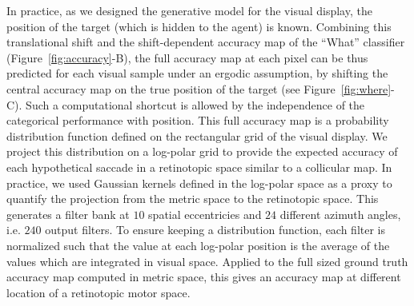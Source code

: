 In practice, as we designed the generative model for the visual display, the position of the target (which is hidden to the agent) is known. Combining this translational shift and the shift-dependent accuracy map of the ``What'' classifier (Figure~\ref{fig:accuracy}-B), the full accuracy map at each pixel can be thus predicted for each visual sample under an ergodic assumption, by shifting the central accuracy map on the true position of the target (see Figure~\ref{fig:where}-C). Such a computational shortcut is allowed by the independence of the categorical performance with position. %
This full accuracy map is a probability distribution function defined on the rectangular grid of the visual display. We project this distribution on a log-polar grid to provide the expected accuracy of each hypothetical saccade in a retinotopic space similar to a collicular map. In practice, we used Gaussian kernels defined in the log-polar space as a proxy to quantify the projection from the metric space to the retinotopic space. This generates a filter bank at $10$ spatial eccentricies and $24$ different azimuth angles, i.e. $240$ output filters. To ensure keeping a distribution function, each filter is normalized such that the value at each log-polar position is the average of the values which are integrated in visual space. Applied to the full sized ground truth accuracy map computed in metric space, this gives an accuracy map at different location of a retinotopic motor space. %



